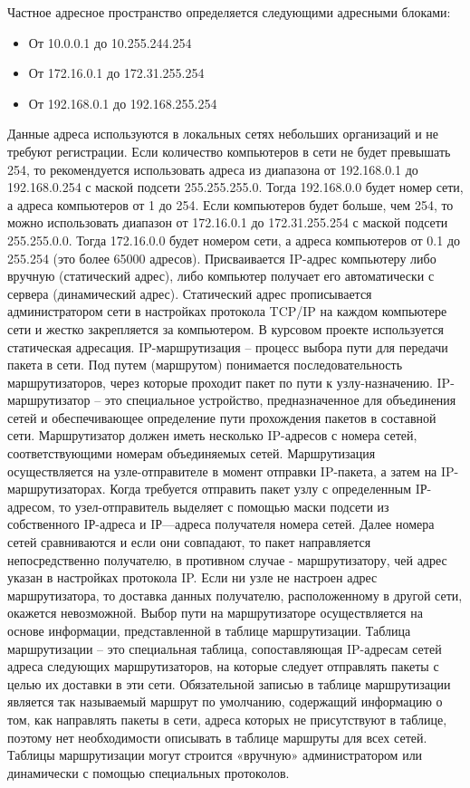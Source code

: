 Частное адресное пространство определяется следующими адресными блоками:
\begin{itemize}
\item От 10.0.0.1 до 10.255.244.254
\item От 172.16.0.1 до 172.31.255.254
\item От 192.168.0.1 до 192.168.255.254
\end{itemize}
Данные адреса используются в локальных сетях небольших организаций и не требуют регистрации.
Если количество компьютеров в сети не будет превышать 254, то рекомендуется использовать адреса из диапазона от 192.168.0.1 до 192.168.0.254 с маской подсети 255.255.255.0. Тогда 192.168.0.0 будет номер сети, а адреса компьютеров от 1 до 254. Если компьютеров будет больше, чем 254, то можно использовать диапазон от 172.16.0.1 до 172.31.255.254 с маской подсети 255.255.0.0. Тогда 172.16.0.0 будет номером сети, а адреса компьютеров от 0.1 до 255.254 (это более 65000 адресов).
Присваивается IP-адрес компьютеру либо вручную (статический адрес), либо компьютер получает его автоматически с сервера (динамический адрес). Статический адрес прописывается администратором сети в настройках протокола TCP/IP на каждом компьютере сети и жестко закрепляется за компьютером. В курсовом проекте используется статическая адресация.
IP-маршрутизация – процесс выбора пути для передачи пакета в сети. Под путем (маршрутом) понимается последовательность маршрутизаторов, через которые проходит пакет по пути к узлу-назначению. IP-маршрутизатор – это специальное устройство, предназначенное для объединения сетей и обеспечивающее определение пути прохождения пакетов в составной сети. Маршрутизатор должен иметь несколько IP-адресов с номера сетей, соответствующими номерам объединяемых сетей. Маршрутизация осуществляется на узле-отправителе в момент отправки IP-пакета, а затем на IP-маршрутизаторах.
Когда требуется отправить пакет узлу с определенным IР-адресом, то узел-отправитель выделяет с помощью маски подсети из собственного IР-адреса и IР—адреса получателя номера сетей. Далее номера сетей сравниваются и если они совпадают, то пакет направляется непосредственно получателю, в противном случае - маршрутизатору, чей адрес указан в настройках протокола IP. Если ни узле не настроен адрес маршрутизатора, то доставка данных получателю, расположенному в другой сети, окажется невозможной.
Выбор пути на маршрутизаторе осуществляется на основе информации, представленной в таблице маршрутизации. Таблица маршрутизации – это специальная таблица, сопоставляющая IP-адресам сетей адреса следующих маршрутизаторов, на которые следует отправлять пакеты с целью их доставки в эти сети. Обязательной записью в таблице маршрутизации является так называемый маршрут по умолчанию, содержащий информацию о том, как направлять пакеты в сети, адреса которых не присутствуют в таблице, поэтому нет необходимости описывать в таблице маршруты для всех сетей. Таблицы маршрутизации могут строится «вручную» администратором или динамически с помощью специальных протоколов.


